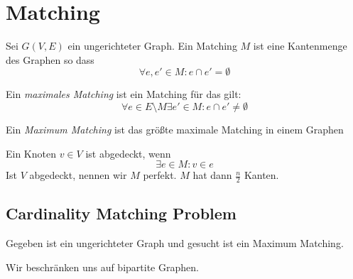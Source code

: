 \documentclass[11pt]{scrbook}
\begin{document}
\section{Matching}

\begin{df}
Sei $G(V,E)$ ein ungerichteter Graph.
Ein Matching $M$ ist eine Kantenmenge des Graphen so dass
\[
\forall e,e'\in M : e \cap e' = \emptyset
\]
\end{df}
\begin{df}
Ein \emph{maximales Matching} ist ein Matching für das gilt:
\[
\forall e\in E\setminus M \exists e'\in M: e\cap e'\neq \emptyset
\]
\end{df}
\begin{df}
Ein \emph{Maximum Matching} ist das größte maximale Matching in einem Graphen
\end{df}
\begin{df}
Ein Knoten $v\in V$ ist abgedeckt, wenn
\[
\exists e\in M : v\in e
\]
Ist $V$ abgedeckt, nennen wir $M$ perfekt.
$M$ hat dann $\frac n2$ Kanten.
\end{df}

\subsection{Cardinality Matching Problem}
Gegeben ist ein ungerichteter Graph und gesucht ist ein Maximum Matching.

Wir beschränken uns auf bipartite Graphen.
\end{document}
